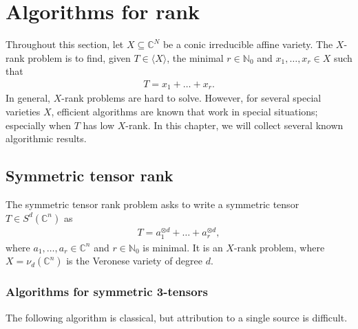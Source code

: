 \chapter{Algorithms for rank}
\label{tensorAlgorithms-chapter-intro}

Throughout this section, let $ X \subseteq \mathbb C^N  $ be a conic irreducible affine variety. 
The $ X $-rank problem is to find, given $ T\in \langle X \rangle $, the minimal $ r\in \mathbb N_0 $ and $ x_1,\ldots,x_r \in X $ such that 
\begin{align*}
	T = x_1 + \ldots + x_r. 
\end{align*}
In general, $ X $-rank problems are hard to solve. However, for several special varieties $ X $, efficient algorithms are known that work in special situations; especially when $ T $ has low $ X $-rank. 
In this chapter, we will collect several known algorithmic results. 


\section{Symmetric tensor rank}
\label{tensorAlgorithms-section-symmetricTensorRank}

The symmetric tensor rank problem asks to write a symmetric tensor $ T\in S^d(\mathbb C^n) $ as
\begin{align*}
	T = a_1^{\otimes d} + \ldots + a_r^{\otimes d}, 
\end{align*}
where $ a_1,\ldots,a_r\in \mathbb C^n $ and $ r \in \mathbb{N}_0$ is minimal. It is an $ X $-rank problem, where $ X = \nu_d(\mathbb C^n) $ is the Veronese variety of degree $ d $. %



\subsection{Algorithms for symmetric 3-tensors}
\label{tensorAlgorithms-subsection-algorithmsSymmetric3Tensors}

The following algorithm is classical, but attribution to a single source is difficult. %


